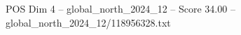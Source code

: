 \begin{textsample}{POS Dim 4 – global\_north\_2024\_12 – Score 34.00 – global\_north\_2024\_12/118956328.txt}
\end{textsample}
